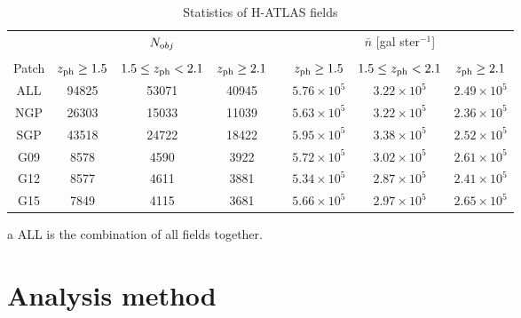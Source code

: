 %
\begin{table}[t]
\centering
\caption{Statistics of H-ATLAS fields}
\begin{threeparttable}
\begin{tabular}{cccccccc}
\toprule
\midrule
\multicolumn{1}{c}{} & \multicolumn{3}{c}{$N_{\rm obj}$} & \multicolumn{1}{c}{} & \multicolumn{3}{c}{$\bar{n}$ [gal ster$^{-1}$]}\\
\cline{2-4} \cline{6-8} \\
Patch & $z_{\rm{ph}} \ge 1.5$ & $1.5 \le z_{\rm{ph}} < 2.1$ & $z_{\rm{ph}} \ge 2.1$
&  & $z_{\rm{ph}} \ge 1.5$ & ${1.5 \le z_{\rm{ph}} < 2.1}$ & $z_{\rm{ph}} \ge 2.1$\\
\midrule
ALL\tnote{a}   &   94825 &   53071   &    40945   &  & $5.76 \times 10^{5}$ & $3.22 \times 10^{5}$ & $2.49 \times 10^{5}$\\
NGP  &   26303 &   15033   &    11039  & & $5.63 \times 10^{5}$ & $ 3.22 \times 10^{5}$ & $2.36 \times 10^{5}$\\
SGP  &   43518 &   24722   &    18422  & & $5.95 \times 10^{5}$ & $3.38 \times 10^{5}$ & $2.52 \times 10^{5}$  \\
G09   &   8578   &   4590   &    3922    & & $5.72 \times 10^{5}$ & $3.02 \times 10^{5}$ & $2.61 \times 10^{5}$\\
G12   &   8577   &   4611   &    3881    & & $5.34 \times 10^{5}$ & $2.87 \times 10^{5}$ & $2.41 \times 10^{5}$\\
G15   &   7849   &   4115   &    3681    & & $5.66 \times 10^{5}$ & $2.97 \times 10^{5}$ & $2.65 \times 10^{5}$\\
\bottomrule
\end{tabular}
\begin{tablenotes}
\item[a] ALL is the combination of all fields together.
\end{tablenotes}
\end{threeparttable}
\label{herschel_patches}
\end{table}
%

\section{Analysis method}
\label{sec:analysis}
